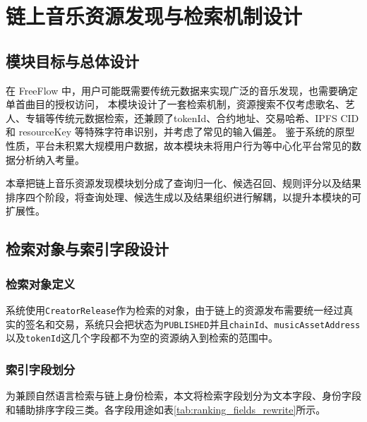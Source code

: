 
\chapter{链上音乐资源发现与检索机制设计}


\section{模块目标与总体设计}

在 FreeFlow 中，用户可能既需要传统元数据来实现广泛的音乐发现，也需要确定单首曲目的授权访问，
本模块设计了一套检索机制，资源搜索不仅考虑歌名、艺人、专辑等传统元数据检索，还兼顾了tokenId、合约地址、交易哈希、IPFS CID 和 resourceKey 等特殊字符串识别，并考虑了常见的输入偏差。 鉴于系统的原型性质，平台未积累大规模用户数据，故本模块未将用户行为等中心化平台常见的数据分析纳入考量。

本章把链上音乐资源发现模块划分成了查询归一化、候选召回、规则评分以及结果排序四个阶段，将查询处理、候选生成以及结果组织进行解耦，以提升本模块的可扩展性。


\section{检索对象与索引字段设计}

\subsection{检索对象定义}

系统使用\texttt{CreatorRelease}作为检索的对象，由于链上的资源发布需要统一经过真实的签名和交易，系统只会把状态为\texttt{PUBLISHED}并且\texttt{chainId}、\texttt{musicAssetAddress}以及\texttt{tokenId}这几个字段都不为空的资源纳入到检索的范围中。

\subsection{索引字段划分}

为兼顾自然语言检索与链上身份检索，本文将检索字段划分为文本字段、身份字段和辅助排序字段三类。各字段用途如表\ref{tab:ranking_fields_rewrite}所示。

